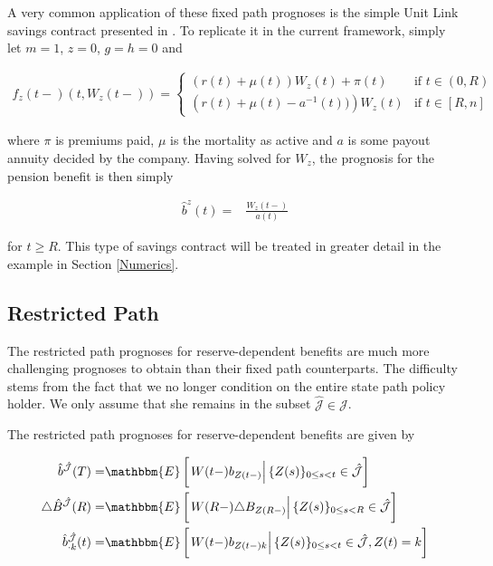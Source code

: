\documentclass{article}
\newcommand{\1}[1]{\mathbbm{1}_{\left\lbrace #1 \right\rbrace}}
\newcommand{\econd}[2][def]{\mathbbm{E} \left[ \left. #1 \right| #2 \right]}
\theoremstyle{break}
\theoremstyle{remark}
\newenvironment{remark}
  {\pushQED{\qed}\renewcommand{\qedsymbol}{\scalebox{1.4}{$\circ$}}\remarkx}
  {\popQED\endremarkx}
\numberwithin{equation}{section}
\begin{document}
\begin{remark}
	A very common application of these fixed path prognoses is the simple Unit Link savings contract presented in \cite{Munk}. To replicate it in the current framework, simply let $m=1$, $z = 0$, $g=h=0$ and

\begin{align*}
	f_z(t-)(t,W_z(t-)) =
	\left\{
	\begin{array}{ll}
		\left( r(t) + \mu(t) \right) W_z(t) + \pi(t) & \mbox{if } t \in (0,R) \\
		\left( r(t) + \mu(t) - a^{-1}(t)) \right) W_z(t) & \mbox{if } t \in [R,n]
	\end{array}
	\right.
\end{align*}

where $\pi$ is premiums paid, $\mu$ is the mortality as active and $a$ is some payout annuity decided by the company. Having solved for $W_z$, the prognosis for the pension benefit is then simply

\begin{align*}
	\hat{b}^{z}(t) =& \frac{W_z(t-)}{a(t)}
\end{align*}

for $t \geq R$. This type of savings contract will be treated in greater detail in the example in Section \ref{Numerics}.
\end{remark}

\newpage
\subsection{Restricted Path}

The restricted path prognoses for reserve-dependent benefits are much more challenging prognoses to obtain than their fixed path counterparts. The difficulty stems from the fact that we no longer condition on the entire state path policy holder. We only assume that she remains in the subset $\hat{\mathcal{J}} \in \mathcal{J}$.

The restricted path prognoses for reserve-dependent benefits are given by

\begin{align*}
\hat{b}^{\hat{\mathcal{J}}}(T) =& \econd[W(t-) b_{Z(t-)}]{\{Z(s) \}_{0 \leq s < t} \in \hat{\mathcal{J}}} \\
\triangle \hat{B}^{\hat{\mathcal{J}}}(R) =& \econd[W(R-) \triangle B_{Z(R-)}]{\{Z(s) \}_{0 \leq s < R} \in \hat{\mathcal{J}}} \\
\hat{b}^{\hat{\mathcal{J}}}_{\cdot k}(t) =& \econd[W(t-) b_{Z(t-)k}]{\{Z(s) \}_{0 \leq s < t} \in \hat{\mathcal{J}}, Z(t) = k}
\end{align*}
\end{document}
